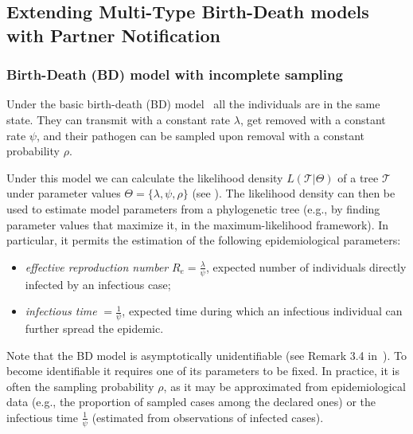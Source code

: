 \documentclass[10pt,letterpaper]{article}
\begin{document}
\subsection*{Extending Multi-Type Birth-Death models with Partner Notification}
\subsubsection*{Birth-Death (BD) model with incomplete sampling}
Under the basic birth-death (BD) model~\cite{Stadler2009} all the individuals are in the same state. They can transmit with a constant rate $\lambda$, get removed with a constant rate $\psi$, and their pathogen can be sampled upon removal with a constant probability $\rho$. 

Under this model we can calculate the likelihood density $L(\mathscr{T}|\Theta)$ of a tree $\mathscr{T}$ under parameter values $\Theta = \{\lambda, \psi, \rho\}$ (see ). The likelihood density can then be used to estimate model parameters from a phylogenetic tree (e.g., by finding parameter values that maximize it, in the maximum-likelihood framework). In particular, it permits the estimation of the following epidemiological parameters: 

\begin{itemize}
\item \textit{effective reproduction number} $R_e = \frac{\lambda}{\psi}$, expected number of individuals directly infected by an infectious case;
\item \textit{infectious time} $=\frac{1}{\psi}$, expected time during which an infectious individual can further spread the epidemic.
\end{itemize} 


Note that the BD model is asymptotically unidentifiable (see Remark 3.4 in~\cite{Stadler2009}). To become identifiable it requires one of its parameters to be fixed. In practice, it is often the sampling probability $\rho$, as it may be approximated from epidemiological data (e.g., the proportion of sampled cases among the declared ones) or the infectious time $\frac{1}{\psi}$ (estimated from observations of infected cases). 
\end{document}
